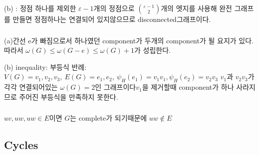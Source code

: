 \documentclass{oblivoir}
\begin{document}
(b) : 정점 하나를 제외한 $\varepsilon-1$개의 정점으로 ${\varepsilon-1 \choose 2}$개의 엣지를 사용해 완전 그래프를 만들면 정점하나는 연결되어 있지않으므로 disconnected그래프이다.
\subsubsection{} 
%
\subsubsection{} 
%
\subsubsection{} 

(a)간선 e가 빠짐으로서 하나였던 component가 두개의 component가 될 요지가 있다. 따라서 $\omega(G) \le \omega(G-e) \le \omega(G)+1 $가 성립한다.

(b) inequality: 부등식
반례: $V(G) = { v_1, v_2, v_3} ,\: E(G) = { e_1 , e_2} ,\: \psi_H(e_1) = v_1v_1 ,\psi_H(e_2) = v_2v_3  $
$v_1$과 $v_2v_3$가 각각 연결되어있는 $\omega(G) = 2$인 그래프이다$v_1$을 제거할때 component가 하나 사라지므로 주어진 부등식을 만족하지 못한다.
\subsubsection{} 
\subsubsection{} 
\subsubsection{} 
\subsubsection{} 
\subsubsection{} 

\subsubsection{} 
$uv, uw, uw \in E $이면 $G$는 complete가 되기때문에 $uw \notin E$

\subsection{Cycles}
\end{document}

